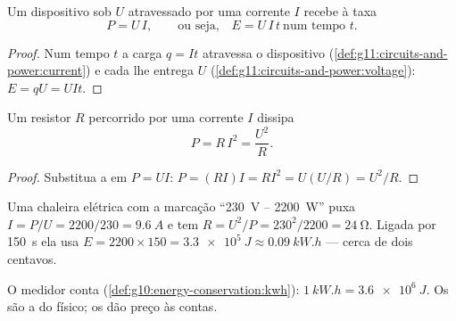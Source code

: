 \begin{proposition}\label{prop:g11:circuits-and-power:power}
Um dispositivo sob  $U$ atravessado por uma corrente $I$ recebe
 à taxa
\[ P = U\,I , \qquad\text{ou seja,}\quad E = U\,I\,t \ \text{num tempo } t . \]
\end{proposition}

\begin{proof}
Num tempo $t$ a carga $q = It$ atravessa o dispositivo
(\cref{def:g11:circuits-and-power:current}) e cada  lhe entrega
$U$  (\cref{def:g11:circuits-and-power:voltage}): $E = qU = UIt$.
\end{proof}

\begin{proposition}\label{prop:g11:circuits-and-power:ri2}
Um resistor $R$ percorrido por uma corrente $I$ dissipa
\[ P = R\,I^2 = \frac{U^2}{R} . \]
\end{proposition}

\begin{proof}
Substitua a  em $P = UI$:
$P = (RI)I = RI^2 = U(U/R) = U^2/R$.
\end{proof}

\begin{example}\label{ex:g11:circuits-and-power:nameplate}
Uma chaleira elétrica com a marcação ``\qty{230}{V} -- \qty{2200}{W}''
puxa $I = P/U = 2200/230 = \qty{9.6}{A}$ e tem 
$R = U^2/P = 230^2/2200 = \qty{24}{\ohm}$. Ligada por \qty{150}{s} ela
usa $E = 2200 \times 150 = \qty{3.3e5}{J} \approx \qty{0.09}{kW.h}$ ---
cerca de dois centavos.
\end{example}

\begin{remark}\label{rem:g11:circuits-and-power:kwh}
O medidor conta 
(\cref{def:g10:energy-conservation:kwh}):
$\qty{1}{kW.h} = \qty{3.6e6}{J}$. Os  são a  do físico; os
 dão preço às contas.
\end{remark}

